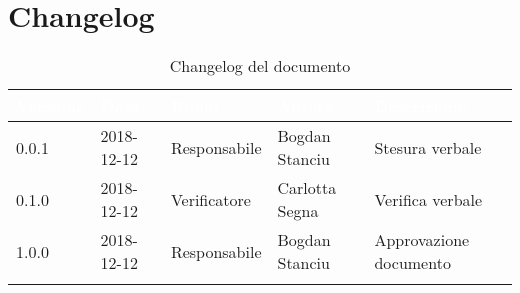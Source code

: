 \newpage

\section{Changelog}

\begin{center}
\begin{longtable}[c]{|m{}|m{}|m{}|m{}|p{}|}
\hline
\rowcolor{bluelogo}\textbf{\textcolor{white}{Versione}} & \textbf{\textcolor{white}{Data}} & \textbf{\textcolor{white}{Ruolo}} & \textbf{\textcolor{white}{Autore}} & \textbf{\textcolor{white}{Descrizione}}\\
\hline \hline
\endfirsthead
0.0.1 & 2018-12-12 & Responsabile &  Bogdan Stanciu & Stesura verbale \\
\hline
\rowcolor{grigio} 0.1.0 & 2018-12-12 & Verificatore & Carlotta Segna & Verifica verbale\\
\hline
1.0.0 & 2018-12-12 & Responsabile & Bogdan Stanciu & Approvazione documento\\ 
\hline

\caption{Changelog del documento}
\end{longtable}
\end{center}
